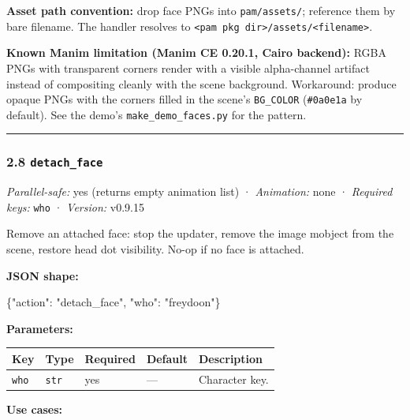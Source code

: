 \documentclass[
  12pt,
  letterpaper,
]{book}
\newenvironment{Shaded}{}{}
\newcommand{\DataTypeTok}[1]{\textcolor[rgb]{0.56,0.13,0.00}{#1}}
\newcommand{\FunctionTok}[1]{\textcolor[rgb]{0.02,0.16,0.49}{#1}}
\newcommand{\StringTok}[1]{\textcolor[rgb]{0.25,0.44,0.63}{#1}}
\begin{document}
\textbf{Asset path convention:} drop face PNGs into
\texttt{pam/assets/}; reference them by bare filename. The handler
resolves to
\texttt{\textless{}pam\ pkg\ dir\textgreater{}/assets/\textless{}filename\textgreater{}}.

\textbf{Known Manim limitation (Manim CE 0.20.1, Cairo backend):} RGBA
PNGs with transparent corners render with a visible alpha-channel
artifact instead of compositing cleanly with the scene background.
Workaround: produce opaque PNGs with the corners filled in the scene's
\texttt{BG\_COLOR} (\texttt{\#0a0e1a} by default). See the demo's
\texttt{make\_demo\_faces.py} for the pattern.

\begin{center}\rule{0.5\linewidth}{0.5pt}\end{center}

\subsubsection{\texorpdfstring{2.8
\texttt{detach\_face}}{2.8 detach\_face}}\label{detach_face}

\emph{Parallel-safe:} yes (returns empty animation list) ·
\emph{Animation:} none · \emph{Required keys:} \texttt{who} ·
\emph{Version:} v0.9.15

Remove an attached face: stop the updater, remove the image mobject from
the scene, restore head dot visibility. No-op if no face is attached.

\textbf{JSON shape:}

\begin{Shaded}
\begin{Highlighting}[]
\FunctionTok{\{}\DataTypeTok{"action"}\FunctionTok{:} \StringTok{"detach\_face"}\FunctionTok{,} \DataTypeTok{"who"}\FunctionTok{:} \StringTok{"freydoon"}\FunctionTok{\}}
\end{Highlighting}
\end{Shaded}

\textbf{Parameters:}

\begin{longtable}[]{@{}lllll@{}}
\toprule\noalign{}
Key & Type & Required & Default & Description \\
\midrule\noalign{}
\endhead
\bottomrule\noalign{}
\endlastfoot
\texttt{who} & \texttt{str} & yes & --- & Character key. \\
\end{longtable}

\textbf{Use cases:}
\end{document}
